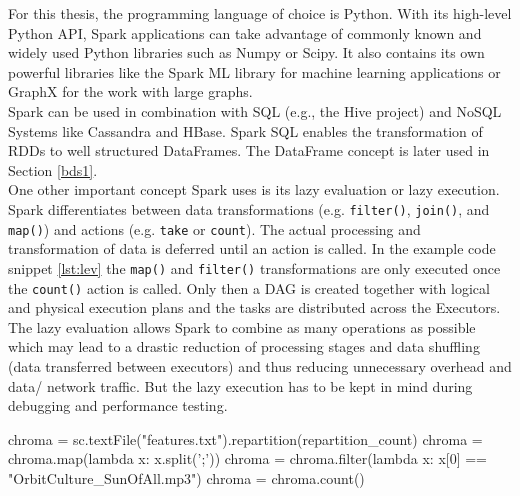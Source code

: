For this thesis, the programming language of choice is Python. With its high-level Python API, Spark applications can take advantage of commonly known and widely used Python libraries such as Numpy or Scipy. It also contains its own powerful libraries like the Spark ML library for machine learning applications or GraphX for the work with large graphs.\\ 
Spark can be used in combination with SQL (e.g., the Hive project) and NoSQL Systems like Cassandra and HBase. Spark SQL enables the transformation of RDDs to well structured DataFrames. The DataFrame concept is later used in Section \ref{bds1}.\\
One other important concept Spark uses is its lazy evaluation or lazy execution. Spark differentiates between data transformations (e.g. \lstinline{filter()}, \lstinline{join()}, and \lstinline{map()}) and actions (e.g. \lstinline{take} or \lstinline{count}). The actual processing and transformation of data is deferred until an action is called. In the example code snippet \ref{lst:lev} the \lstinline{map()} and \lstinline{filter()} transformations are only executed once the \lstinline{count()} action is called. Only then a DAG is created together with logical and physical execution plans and the tasks are distributed across the Executors. The lazy evaluation allows Spark to combine as many operations as possible which may lead to a drastic reduction of processing stages and data shuffling (data transferred between executors) and thus reducing unnecessary overhead and data/ network traffic. But the lazy execution has to be kept in mind during debugging and performance testing. \cite[p.73]{sparkbook1}

\begin{pythonCode}[frame=single,label={lst:lev},caption={lazy evaluation},captionpos=b]
chroma = sc.textFile("features.txt").repartition(repartition_count)
chroma = chroma.map(lambda x: x.split(';'))
chroma = chroma.filter(lambda x: x[0] == "OrbitCulture_SunOfAll.mp3")
chroma = chroma.count()
\end{pythonCode}

